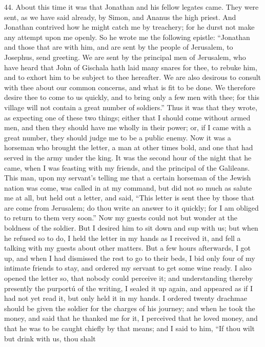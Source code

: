 44. About this time it was that Jonathan and his fellow legates came. They
were sent, as we have said already, by Simon, and Ananus the high priest.
And Jonathan contrived how he might catch me by treachery; for he durst
not make any attempt upon me openly. So he wrote me the following epistle:
``Jonathan and those that are with him, and are sent by the people of
Jerusalem, to Josephus, send greeting. We are sent by the principal men of
Jerusalem, who have heard that John of Gischala hath laid many snares for
thee, to rebuke him, and to exhort him to be subject to thee hereafter. We
are also desirous to consult with thee about our common concerns, and what
is fit to be done. We therefore desire thee to come to us quickly, and to
bring only a few men with thee; for this village will not contain a great
number of soldiers.'' Thus it was that they wrote, as expecting one of
these two things; either that I should come without armed men, and then
they should have me wholly in their power; or, if I came with a great
number, they should judge me to be a public enemy. Now it was a horseman
who brought the letter, a man at other times bold, and one that had served
in the army under the king. It was the second hour of the night that he
came, when I was feasting with my friends, and the principal of the
Galileans. This man, upon my servant's telling me that a certain horseman
of the Jewish nation was come, was called in at my command, but did not so
much as salute me at all, but held out a letter, and said, ``This letter is
sent thee by those that are come from Jerusalem; do thou write an answer
to it quickly; for I am obliged to return to them very soon.'' Now my
guests could not but wonder at the boldness of the soldier. But I desired
him to sit down and sup with us; but when he refused so to do, I held the
letter in my hands as I received it, and fell a talking with my guests
about other matters. But a few hours afterwards, I got up, and when I had
dismissed the rest to go to their beds, I bid only four of my intimate
friends to stay, and ordered my servant to get some wine ready. I also
opened the letter so, that nobody could perceive it; and understanding
thereby presently the purportú of the writing, I sealed it up again, and
appeared as if I had not yet read it, but only held it in my hands. I
ordered twenty drachmae should be given the soldier for the charges of his
journey; and when he took the money, and said that he thanked me for it, I
perceived that he loved money, and that he was to be caught chiefly by
that means; and I said to him, ``If thou wilt but drink with us, thou shalt
